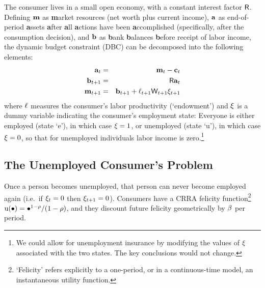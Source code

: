 \message{ !name(TractableBufferStock.tex)}\documentclass{handout}
\begin{document}
The consumer lives in a small open economy, with a constant interest factor $\mathsf{R}$.  Defining $\mathbf{m}$ as
{\bf m}arket resources (net worth plus current income), $\mathbf{a}$ as
end-of-period {\bf a}ssets {\bf a}fter {\bf a}ll {\bf a}ctions have been {\bf a}ccomplished
(specifically, after the consumption decision), and $\mathbf{b}$ as {\bf b}ank
{\bf b}alances {\bf b}efore receipt of labor income, the dynamic budget constraint (DBC) can be decomposed into the
following elements:
\begin{eqnarray}
    \mathbf{a}_{t} & = & \mathbf{m}_{t}-\mathbf{c}_{t}
\\  \mathbf{b}_{t+1} & = & \mathsf{R} \mathbf{a}_{t}
\\  \mathbf{m}_{t+1} & = & \mathbf{b}_{t+1}+\ell_{t+1}\mathsf{W}_{t+1}\xi_{t+1}  \label{eq:DBC}
\end{eqnarray}
where $\ell$ measures the consumer's labor productivity
(`endowment') and $\xi$ is a dummy variable indicating the
consumer's employment state: Everyone is either
employed (state `e'), in which case $\xi = 1$, or unemployed
(state `u'), in which case $\xi=0$, so that for unemployed
individuals labor income is zero.\footnote{We could allow for
  unemployment insurance by modifying the values of $\xi$
  associated with the two states.  The key conclusions would not
  change.}

\pagebreak 
\subsection{The Unemployed Consumer's Problem} \label{subsec:Fred}

Once a person becomes unemployed, that person can never become
employed again (i.e.\ if $\xi_{t}=0$ then $\xi_{t+1}=0$).
Consumers have a CRRA felicity function\footnote{`Felicity' refers
  explicitly to a one-period, or in a continuous-time model, an
  instantaneous utility function.}
${\mathrm{u}}(\bullet)= \bullet^{1-\rho}/(1-\rho)$, and they discount
future felicity geometrically by $\beta$ per period.
\end{document}
